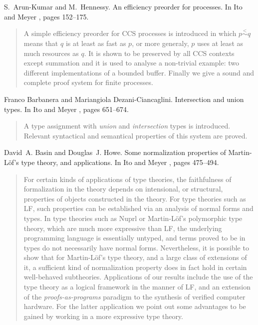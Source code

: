 \begin{thebibliography}{10}
S.~Arun-Kumar and M.~Hennessy.
\newblock An efficiency preorder for processes.
\newblock In Ito and Meyer \cite{TACS91}, pages 152--175.
\begin{quotation}
A simple efficiency preorder for CCS processes is introduced in which
  $p\stackrel{<}{\sim}q$ means that $q$ is at least as fast as $p$, or more
  generaly, $p$ uses at least as much resources as $q$. It is shown to be
  preserved by all CCS contexts except summation and it is used to analyse a
  non-trivial example: two different implementations of a bounded buffer.
  Finally we give a sound and complete proof system for finite processes.
\end{quotation}

Franco Barbanera and Mariangiola Dezani-Ciancaglini.
\newblock Intersection and union types.
\newblock In Ito and Meyer \cite{TACS91}, pages 651--674.
\begin{quotation}
A type assignment with {\em union\/} and {\em intersection\/} types is
  introduced. Relevant syntactical and semantical properties of this system are
  proved.
\end{quotation}

David~A. Basin and Douglas~J. Howe.
\newblock Some normalization properties of {Martin-L\"of's} type theory, and
  applications.
\newblock In Ito and Meyer \cite{TACS91}, pages 475--494.
\begin{quotation}
For certain kinds of applications of type theories, the faithfulness of
  formalization in the theory depends on intensional, or structural, properties
  of objects constructed in the theory. For type theories such as LF, such
  properties can be established via an analysis of normal forms and types. In
  type theories such as Nuprl or Martin-L\"of's polymorphic type theory, which
  are much more expressive than LF, the underlying programming language is
  essentially untyped, and terms proved to be in types do not necessarily have
  normal forms. Nevertheless, it is possible to show that for Martin-L\"of's
  type theory, and a large class of extensions of it, a sufficient kind of
  normalization property does in fact hold in certain well-behaved subtheories.
  Applications of our results include the use of the type theory as a logical
  framework in the manner of LF, and an extension of the {\em
  proofs-as-programs} paradigm to the synthesis of verified computer hardware.
  For the latter application we point out some advantages to be gained by
  working in a more expressive type theory.
\end{quotation}


\end{thebibliography}
